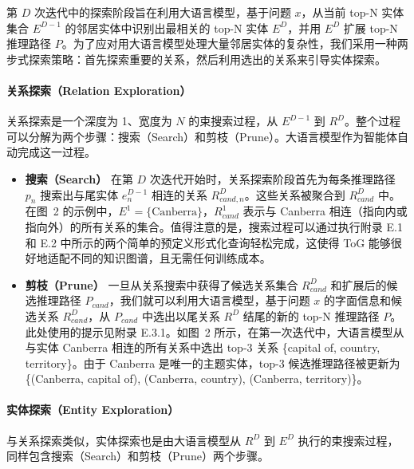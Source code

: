 \documentclass[11pt,UTF8,fontset=fandol]{ctexart}
\begin{document}
第 $D$ 次迭代中的探索阶段旨在利用大语言模型，基于问题 $x$，从当前 top-N 实体集合 $E^{D-1}$ 的邻居实体中识别出最相关的 top-N 实体 $E^D$，并用 $E^D$ 扩展 top-N 推理路径 $P$。为了应对用大语言模型处理大量邻居实体的复杂性，我们采用一种两步式探索策略：首先探索重要的关系，然后利用选出的关系来引导实体探索。

\paragraph{关系探索（Relation Exploration）}
关系探索是一个深度为 1、宽度为 $N$ 的束搜索过程，从 $E^{D-1}$ 到 $R^D$。整个过程可以分解为两个步骤：搜索（Search）和剪枝（Prune）。大语言模型作为智能体自动完成这一过程。

\begin{itemize}[leftmargin=1.4em]
\item \textbf{搜索（Search）} 在第 $D$ 次迭代开始时，关系探索阶段首先为每条推理路径 $p_n$ 搜索出与尾实体 $e_n^{D-1}$ 相连的关系 $R_{cand,n}^D$。这些关系被聚合到 $R_{cand}^D$ 中。在图~2 的示例中，$E^1 = \{\text{Canberra}\}$，$R_{cand}^1$ 表示与 Canberra 相连（指向内或指向外）的所有关系的集合。值得注意的是，搜索过程可以通过执行附录 E.1 和 E.2 中所示的两个简单的预定义形式化查询轻松完成，这使得 ToG 能够很好地适配不同的知识图谱，且无需任何训练成本。
\item \textbf{剪枝（Prune）} 一旦从关系搜索中获得了候选关系集合 $R_{cand}^D$ 和扩展后的候选推理路径 $P_{cand}$，我们就可以利用大语言模型，基于问题 $x$ 的字面信息和候选关系 $R_{cand}^D$，从 $P_{cand}$ 中选出以尾关系 $R^D$ 结尾的新的 top-N 推理路径 $P$。此处使用的提示见附录 E.3.1。如图~2 所示，在第一次迭代中，大语言模型从与实体 Canberra 相连的所有关系中选出 top-3 关系 \{capital of, country, territory\}。由于 Canberra 是唯一的主题实体，top-3 候选推理路径被更新为 \{(Canberra, capital of), (Canberra, country), (Canberra, territory)\}。
\end{itemize}

\paragraph{实体探索（Entity Exploration）}
与关系探索类似，实体探索也是由大语言模型从 $R^D$ 到 $E^D$ 执行的束搜索过程，同样包含搜索（Search）和剪枝（Prune）两个步骤。
\end{document}
